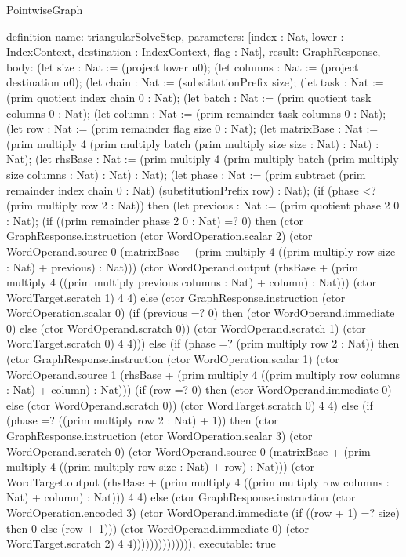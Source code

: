 \begin{lexlean}{PointwiseGraph}
\begin{semanticmodule}
definition{
  name: triangularSolveStep,
  parameters: [index : Nat, lower : IndexContext, destination : IndexContext, flag : Nat],
  result: GraphResponse,
  body: (let size : Nat := (project lower u0); (let columns : Nat := (project destination u0); (let chain : Nat := (substitutionPrefix size); (let task : Nat := (prim quotient index chain 0 : Nat); (let batch : Nat := (prim quotient task columns 0 : Nat); (let column : Nat := (prim remainder task columns 0 : Nat); (let row : Nat := (prim remainder flag size 0 : Nat); (let matrixBase : Nat := (prim multiply 4 (prim multiply batch (prim multiply size size : Nat) : Nat) : Nat); (let rhsBase : Nat := (prim multiply 4 (prim multiply batch (prim multiply size columns : Nat) : Nat) : Nat); (let phase : Nat := (prim subtract (prim remainder index chain 0 : Nat) (substitutionPrefix row) : Nat); (if (phase <? (prim multiply row 2 : Nat)) then (let previous : Nat := (prim quotient phase 2 0 : Nat); (if ((prim remainder phase 2 0 : Nat) =? 0) then (ctor GraphResponse.instruction (ctor WordOperation.scalar 2) (ctor WordOperand.source 0 (matrixBase + (prim multiply 4 ((prim multiply row size : Nat) + previous) : Nat))) (ctor WordOperand.output (rhsBase + (prim multiply 4 ((prim multiply previous columns : Nat) + column) : Nat))) (ctor WordTarget.scratch 1) 4 4) else (ctor GraphResponse.instruction (ctor WordOperation.scalar 0) (if (previous =? 0) then (ctor WordOperand.immediate 0) else (ctor WordOperand.scratch 0)) (ctor WordOperand.scratch 1) (ctor WordTarget.scratch 0) 4 4))) else (if (phase =? (prim multiply row 2 : Nat)) then (ctor GraphResponse.instruction (ctor WordOperation.scalar 1) (ctor WordOperand.source 1 (rhsBase + (prim multiply 4 ((prim multiply row columns : Nat) + column) : Nat))) (if (row =? 0) then (ctor WordOperand.immediate 0) else (ctor WordOperand.scratch 0)) (ctor WordTarget.scratch 0) 4 4) else (if (phase =? ((prim multiply row 2 : Nat) + 1)) then (ctor GraphResponse.instruction (ctor WordOperation.scalar 3) (ctor WordOperand.scratch 0) (ctor WordOperand.source 0 (matrixBase + (prim multiply 4 ((prim multiply row size : Nat) + row) : Nat))) (ctor WordTarget.output (rhsBase + (prim multiply 4 ((prim multiply row columns : Nat) + column) : Nat))) 4 4) else (ctor GraphResponse.instruction (ctor WordOperation.encoded 3) (ctor WordOperand.immediate (if ((row + 1) =? size) then 0 else (row + 1))) (ctor WordOperand.immediate 0) (ctor WordTarget.scratch 2) 4 4)))))))))))))),
  executable: true
}


\end{semanticmodule}
\end{lexlean}
